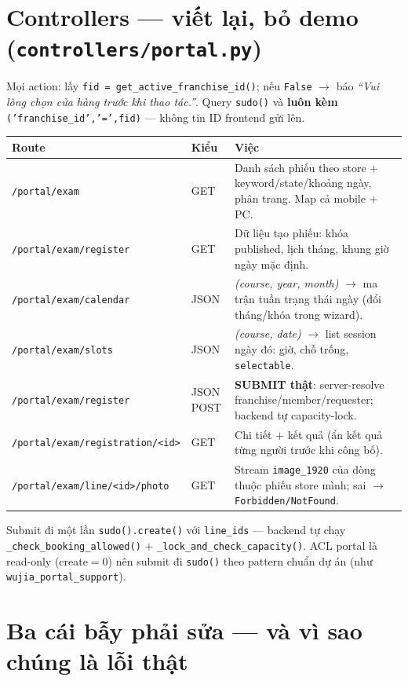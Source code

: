 \section{Controllers --- viết lại, bỏ demo (\texttt{controllers/portal.py})}

Mọi action: lấy \texttt{fid = get\_active\_franchise\_id()}; nếu \texttt{False} $\rightarrow$
báo \emph{``Vui lòng chọn cửa hàng trước khi thao tác.''}. Query \texttt{sudo()} và
\textbf{luôn kèm} \texttt{('franchise\_id','=',fid)} --- không tin ID frontend gửi lên.

\begin{center}
\begin{tabular}{p{4.8cm}p{2.0cm}p{6.6cm}}
\hline
\textbf{Route} & \textbf{Kiểu} & \textbf{Việc} \\
\hline
\texttt{/portal/exam} & GET & Danh sách phiếu theo store $+$ keyword/state/khoảng ngày, phân trang. Map cả mobile $+$ PC. \\
\texttt{/portal/exam/register} & GET & Dữ liệu tạo phiếu: khóa published, lịch tháng, khung giờ ngày mặc định. \\
\texttt{/portal/exam/calendar} & JSON & \emph{(course, year, month)} $\rightarrow$ ma trận tuần trạng thái ngày (đổi tháng/khóa trong wizard). \\
\texttt{/portal/exam/slots} & JSON & \emph{(course, date)} $\rightarrow$ list session ngày đó: giờ, chỗ trống, \texttt{selectable}. \\
\texttt{/portal/exam/register} & JSON POST & \textbf{SUBMIT thật}: server-resolve franchise/member/requester; backend tự capacity-lock. \\
\texttt{/portal/exam/registration/<id>} & GET & Chi tiết $+$ kết quả (ẩn kết quả từng người trước khi công bố). \\
\texttt{/portal/exam/line/<id>/photo} & GET & Stream \texttt{image\_1920} của dòng thuộc phiếu store mình; sai $\rightarrow$ \texttt{Forbidden/NotFound}. \\
\hline
\end{tabular}
\end{center}

Submit đi một lần \texttt{sudo().create()} với \texttt{line\_ids} --- backend tự chạy
\texttt{\_check\_booking\_allowed()} $+$ \texttt{\_lock\_and\_check\_capacity()}. ACL portal
là read-only (create$=$0) nên submit đi \texttt{sudo()} theo pattern chuẩn dự án (như
\texttt{wujia\_portal\_support}).

\section{Ba cái bẫy phải sửa --- và vì sao chúng là lỗi thật}

